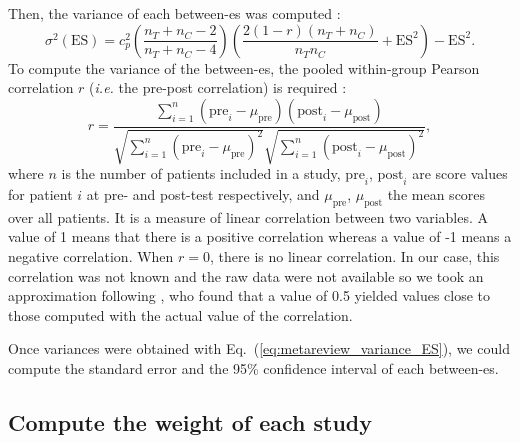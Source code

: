 \documentclass[12pt,a4paper,english]{article}
\begin{document}
Then, the variance of each between-\gls{es} was computed \citep{Morris2008}:
\begin{equation}
\label{eq:metareview_variance_ES}
\sigma^2(\text{ES}) = c_p^2 \left (\frac{n_T + n_C - 2} {n_T + n_C - 4} \right ) \left  (\frac{2(1-r)(n_T + n_C)} {n_Tn_C} + \text{ES}^2 \right) - \text{ES}^2.
\end{equation}
To compute the variance of the between-\gls{es}, the pooled within-group Pearson correlation $r$ (\textit{i.e.} the pre-post correlation) is required 
\citep{James2013}:
\begin{equation}
\label{eq:metareview_within_group_pearson_correlation}
r = \frac{ \sum_{i=1}^{n} (\text{pre}_i - \mu_{\text{pre}})(\text{post}_i - \mu_{\text{post}}) } { \sqrt{ \sum_{i=1}^{n} (\text{pre}_i - \mu_{\text{pre}})^2} \sqrt{\sum_{i=1}^{n} (\text{post}_i - \mu_{\text{post}})^2} }, 
\end{equation}
where $n$ is the number of patients included in a study, $\text{pre}_i$, $\text{post}_i$ are score values for patient $i$ at pre- and post-test 
respectively, and $\mu_{\text{pre}}$, $\mu_{\text{post}}$ the mean scores over all patients. It is a measure of linear correlation between two variables. 
A value of 1 means that there is a positive correlation whereas a value of -1 means a negative correlation. When $r=0$, there is no
linear correlation. In our case, this correlation was not known and the raw data were not available so we took an
approximation following \citet{Balk2012}, who found that a value of 0.5 yielded values close to those computed with the actual value of the correlation. 

Once variances were obtained with Eq.~(\ref{eq:metareview_variance_ES}), we could compute the standard error and the 95\% confidence interval of each between-\gls{es}. 

\subsection{Compute the weight of each study}
\end{document}
